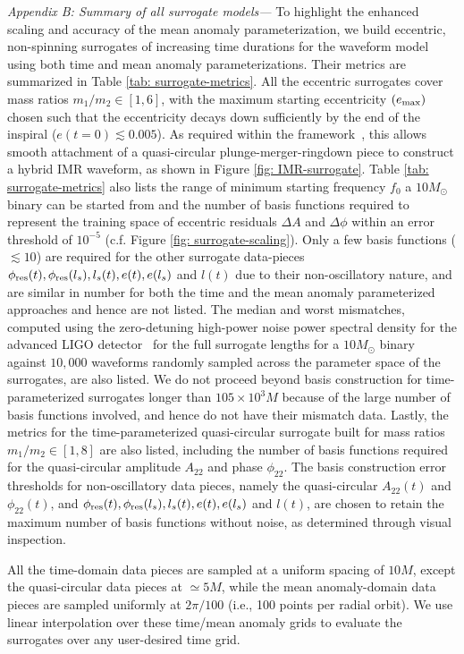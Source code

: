 \textit{Appendix B: Summary of all surrogate models---}
To highlight the enhanced scaling and accuracy of the mean anomaly parameterization, we build eccentric, non-spinning surrogates of increasing time durations for the waveform model \inspiralesigma{} using both time and mean anomaly parameterizations. Their metrics are summarized in Table \ref{tab: surrogate-metrics}. 
All the eccentric surrogates cover mass ratios $m_1/m_2\in[1, 6]$, with the maximum starting eccentricity $(e_{\rm{max}})$ chosen such that the eccentricity decays down sufficiently by the end of the inspiral ($e(t=0) \lesssim 0.005$). As required within the \esigmahm{} framework~\citep{Paul:2024ujx, esigmapy}, this allows smooth attachment of a quasi-circular plunge-merger-ringdown piece to construct a hybrid  IMR waveform, as shown in Figure \ref{fig: IMR-surrogate}. Table \ref{tab: surrogate-metrics} also lists the range of minimum starting frequency $f_0$ a $10M_\odot$ binary can be started from and the number of basis functions required to represent the training space of eccentric residuals $\Delta A$ and $\Delta \phi$ within an error threshold of $10^{-5}$ (c.f. Figure \ref{fig: surrogate-scaling}). Only a few basis functions ($\lesssim 10$) are required for the other surrogate data-pieces $\phi_{\rm{res}}(t), \phi_{\rm{res}}(l_s), l_s(t), e(t), e(l_s)$ and $l(t)$ due to their non-oscillatory nature, and are similar in number for both the time and the mean anomaly parameterized approaches and hence are not listed. The median and worst mismatches, computed using the zero-detuning high-power noise power spectral density for the advanced LIGO detector~\citep{LIGO-T0900288-v3, LIGO-T070247-v1} for the full surrogate lengths for a $10M_\odot$ binary against $10,000$ \inspiralesigma{} waveforms randomly sampled across the parameter space of the surrogates, are also listed. We do not proceed beyond basis construction for time-parameterized surrogates longer than $105 \times 10^3M$ because of the large number of basis functions involved, and hence do not have their mismatch data. Lastly, the metrics for the time-parameterized quasi-circular surrogate built for mass ratios $m_1/m_2\in [1,8]$ are also listed, including the number of basis functions required for the quasi-circular amplitude $A_{22}$ and phase $\phi_{22}$. 
The basis construction error thresholds for non-oscillatory data pieces, namely the quasi-circular $A_{22}(t)$ and $\phi_{22}(t)$, and $\phi_{\rm{res}}(t), \phi_{\rm{res}}(l_s), l_s(t), e(t), e(l_s)$ and $l(t)$, are chosen to retain the maximum number of basis functions without noise, as determined through visual inspection.

All the time-domain data pieces are sampled at a uniform spacing of $10M$, except the quasi-circular data pieces at $\simeq 5M$, while the mean anomaly-domain data pieces are sampled uniformly at $2 \pi/100$ (i.e., 100 points per radial orbit). We use linear interpolation over these time/mean anomaly grids to evaluate the surrogates over any user-desired time grid.




